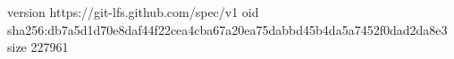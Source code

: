 version https://git-lfs.github.com/spec/v1
oid sha256:db7a5d1d70e8daf44f22cea4cba67a20ea75dabbd45b4da5a7452f0dad2da8e3
size 227961
